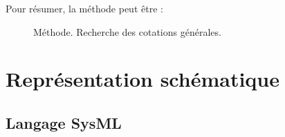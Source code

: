 \documentclass[
	11pt, %
	fleqn, %
	a4paper, %
]{LegrandOrangeBook}
\begin{document}
Pour résumer, la méthode peut être :\\
\begin{figure}[H] %
	\centering %
	\caption{Méthode. Recherche des cotations générales.}
	\label{Tol2} %
\end{figure}










\chapterspaceabove{6.25cm} %
\chapterspacebelow{7.5cm} %

\chapter{Représentation schématique}


\section{Langage SysML}
\end{document}
